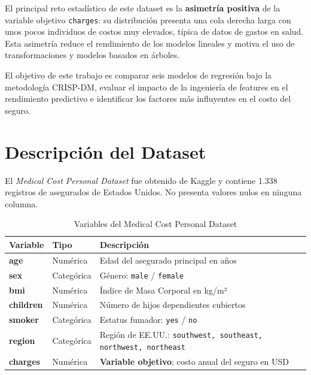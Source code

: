 \documentclass[12pt, a4paper]{article}
\begin{document}
El principal reto estadístico de este dataset es la \textbf{asimetría
positiva} de la variable objetivo \texttt{charges}: su distribución
presenta una cola derecha larga con unos pocos individuos de costos muy
elevados, típica de datos de gastos en salud. Esta asimetría reduce el
rendimiento de los modelos lineales y motiva el uso de transformaciones
y modelos basados en árboles.

El objetivo de este trabajo es comparar seis modelos de regresión bajo
la metodología CRISP-DM, evaluar el impacto de la ingeniería de features
en el rendimiento predictivo e identificar los factores más influyentes
en el costo del seguro.

\section{Descripción del Dataset}

El \textit{Medical Cost Personal Dataset} fue obtenido de Kaggle
\cite{insuranceKaggle} y contiene 1.338 registros de asegurados de
Estados Unidos. No presenta valores nulos en ninguna columna.

\begin{table}[H]
\centering
\caption{Variables del Medical Cost Personal Dataset}
\small
\begin{tabular}{>{\bfseries}p{3.5cm} p{2.2cm} p{7cm}}
\toprule
Variable & Tipo & Descripción \\
\midrule
age      & Numérica   & Edad del asegurado principal en años \\
sex      & Categórica & Género: \texttt{male} / \texttt{female} \\
bmi      & Numérica   & Índice de Masa Corporal en kg/m² \\
children & Numérica   & Número de hijos dependientes cubiertos \\
smoker   & Categórica & Estatus fumador: \texttt{yes} / \texttt{no} \\
region   & Categórica & Región de EE.UU.: \texttt{southwest, southeast,}
                         \texttt{northwest, northeast} \\
charges  & Numérica   & \textbf{Variable objetivo}: costo anual del seguro en USD \\
\bottomrule
\end{tabular}
\label{tab:variables}
\end{table}
\end{document}
